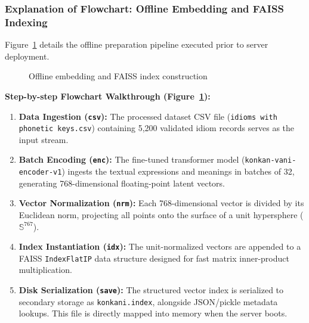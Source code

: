 \documentclass[12pt,a4paper]{article}
\begin{document}
\subsubsection{Explanation of Flowchart: Offline Embedding and FAISS Indexing}
Figure~\ref{fig:indexing} details the offline preparation pipeline executed prior to server deployment.

\begin{figure}[H]
\centering
{}
\caption{Offline embedding and FAISS index construction}
\label{fig:indexing}
\end{figure}

\textbf{Step-by-step Flowchart Walkthrough (Figure~\ref{fig:indexing}):}
\begin{enumerate}
  \item \textbf{Data Ingestion (\texttt{csv}):} The processed dataset CSV file (\texttt{idioms with phonetic keys.csv}) containing 5,200 validated idiom records serves as the input stream.
  \item \textbf{Batch Encoding (\texttt{enc}):} The fine-tuned transformer model (\texttt{konkan-vani-encoder-v1}) ingests the textual expressions and meanings in batches of 32, generating 768-dimensional floating-point latent vectors.
  \item \textbf{Vector Normalization (\texttt{nrm}):} Each 768-dimensional vector is divided by its Euclidean norm, projecting all points onto the surface of a unit hypersphere ($\mathbb{S}^{767}$).
  \item \textbf{Index Instantiation (\texttt{idx}):} The unit-normalized vectors are appended to a FAISS \texttt{IndexFlatIP} data structure designed for fast matrix inner-product multiplication.
  \item \textbf{Disk Serialization (\texttt{save}):} The structured vector index is serialized to secondary storage as \texttt{konkani.index}, alongside JSON/pickle metadata lookups. This file is directly mapped into memory when the server boots.
\end{enumerate}
\end{document}
